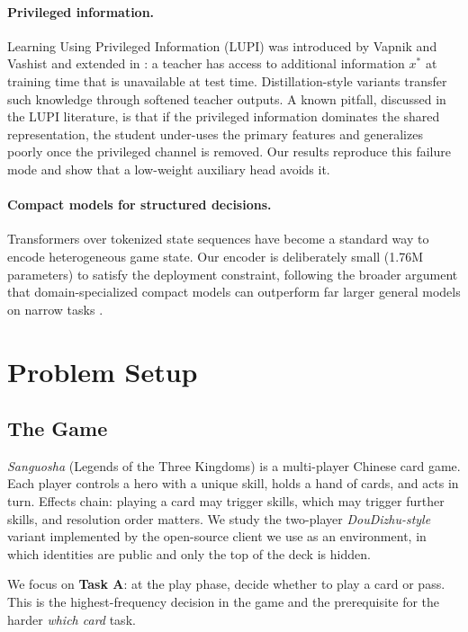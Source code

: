 \documentclass[11pt]{article}
\begin{document}
\paragraph{Privileged information.} Learning Using Privileged Information (LUPI) was introduced by Vapnik and Vashist \cite{vapnik2009} and extended in \cite{vapnik2015}: a teacher has access to additional information $x^{*}$ at training time that is unavailable at test time. Distillation-style variants transfer such knowledge through softened teacher outputs. A known pitfall, discussed in the LUPI literature, is that if the privileged information dominates the shared representation, the student under-uses the primary features and generalizes poorly once the privileged channel is removed. Our results reproduce this failure mode and show that a low-weight auxiliary head avoids it. %

\paragraph{Compact models for structured decisions.} Transformers \cite{vaswani2017} over tokenized state sequences have become a standard way to encode heterogeneous game state. Our encoder is deliberately small (1.76M parameters) to satisfy the deployment constraint, following the broader argument that domain-specialized compact models can outperform far larger general models on narrow tasks \cite{gunasekar2023}.

\section{Problem Setup}
\label{sec:problem}

\subsection{The Game}

\emph{Sanguosha} (Legends of the Three Kingdoms) is a multi-player Chinese card game. Each player controls a hero with a unique skill, holds a hand of cards, and acts in turn. Effects chain: playing a card may trigger skills, which may trigger further skills, and resolution order matters. We study the two-player \emph{DouDizhu-style} variant implemented by the open-source client we use as an environment, in which identities are public and only the top of the deck is hidden.

We focus on \textbf{Task A}: at the play phase, decide whether to play a card or pass. This is the highest-frequency decision in the game and the prerequisite for the harder \emph{which card} task.
\end{document}
